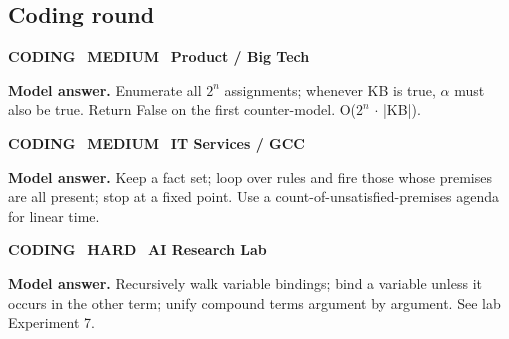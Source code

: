 \documentclass[11pt]{article}
\begin{document}
\subsection*{\color{navyL}Coding round}
\begin{tcolorbox}[enhanced,breakable,colback=white,colframe=navyL,arc=2mm,boxrule=0.8pt,left=3mm,right=3mm,
 title={\textbf{QIII.06}\quad Implement a truth-table checker that decides whether KB entails $\alpha$.},fonttitle=\color{white}\small,colbacktitle=navyL]
\colorbox{navyL!15}{\scriptsize\bfseries\color{navyL} CODING}\
\colorbox{gold!85!black!15}{\scriptsize\bfseries\color{gold!85!black} MEDIUM}\
\colorbox{navy!8}{\scriptsize\bfseries\color{navy} Product / Big Tech}\par\smallskip
\textbf{\color{navy}Model answer.} Enumerate all $2^{n}$ assignments; whenever KB is true, $\alpha$ must also be true. Return False on the first counter-model. O($2^{n}$ $\cdot$ |KB|).
\end{tcolorbox}
\begin{tcolorbox}[enhanced,breakable,colback=white,colframe=navyL,arc=2mm,boxrule=0.8pt,left=3mm,right=3mm,
 title={\textbf{QIII.07}\quad Write a forward-chaining engine for Horn rules and report derived facts.},fonttitle=\color{white}\small,colbacktitle=navyL]
\colorbox{navyL!15}{\scriptsize\bfseries\color{navyL} CODING}\
\colorbox{gold!85!black!15}{\scriptsize\bfseries\color{gold!85!black} MEDIUM}\
\colorbox{navy!8}{\scriptsize\bfseries\color{navy} IT Services / GCC}\par\smallskip
\textbf{\color{navy}Model answer.} Keep a fact set; loop over rules and fire those whose premises are all present; stop at a fixed point. Use a count-of-unsatisfied-premises agenda for linear time.
\end{tcolorbox}
\begin{tcolorbox}[enhanced,breakable,colback=white,colframe=navyL,arc=2mm,boxrule=0.8pt,left=3mm,right=3mm,
 title={\textbf{QIII.08}\quad Implement unification with the occurs check.},fonttitle=\color{white}\small,colbacktitle=navyL]
\colorbox{navyL!15}{\scriptsize\bfseries\color{navyL} CODING}\
\colorbox{crimson!15}{\scriptsize\bfseries\color{crimson} HARD}\
\colorbox{navy!8}{\scriptsize\bfseries\color{navy} AI Research Lab}\par\smallskip
\textbf{\color{navy}Model answer.} Recursively walk variable bindings; bind a variable unless it occurs in the other term; unify compound terms argument by argument. See lab Experiment 7.
\end{tcolorbox}
\end{document}
